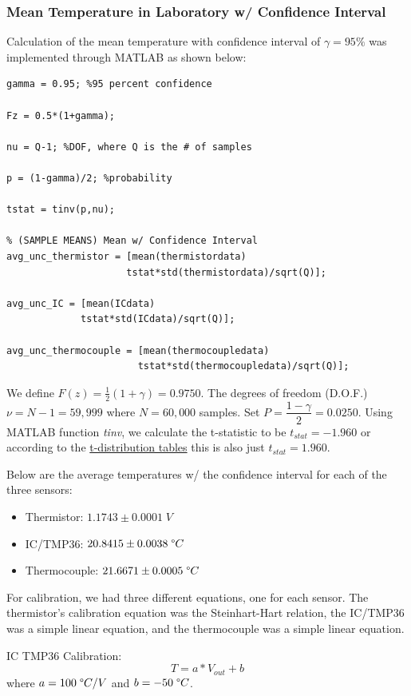 \documentclass{article}
\begin{document}
\subsubsection*{Mean Temperature in Laboratory w/ Confidence Interval}
Calculation of the mean temperature with confidence interval of $\gamma = 95\%$ was implemented through MATLAB as shown below:
\begin{lstlisting}[style=Matlab-editor]
% Confidence Interval in Laboratory
gamma = 0.95; %95 percent confidence

Fz = 0.5*(1+gamma);

nu = Q-1; %DOF, where Q is the # of samples

p = (1-gamma)/2; %probability

tstat = tinv(p,nu); 

% (SAMPLE MEANS) Mean w/ Confidence Interval
avg_unc_thermistor = [mean(thermistordata) 
                     tstat*std(thermistordata)/sqrt(Q)];

avg_unc_IC = [mean(ICdata) 
             tstat*std(ICdata)/sqrt(Q)];

avg_unc_thermocouple = [mean(thermocoupledata)  
                       tstat*std(thermocoupledata)/sqrt(Q)];
\end{lstlisting}

We define $F(z) = \frac{1}{2}(1+\gamma) = 0.9750$. The degrees of freedom (D.O.F.) $\nu = N - 1 = 59,999$ where $N=60,000$ samples. Set $P=\dfrac{1-\gamma}{2}=0.0250$. Using MATLAB function \textit{tinv}, we calculate the t-statistic to be $t_{stat} = -1.960$ or according to the \hyperlink{1}{t-distribution tables} this is also just $t_{stat}=1.960$.

Below are the average temperatures w/ the confidence interval for each of the three sensors:
\begin{itemize}
    \item Thermistor: \(1.1743 \pm 0.0001\; V \)
    \item IC/TMP36: \(20.8415 \pm 0.0038\; \degree C\)
    \item Thermocouple: \(21.6671 \pm 0.0005\; \degree C\)
\end{itemize}

For calibration, we had three different equations, one for each sensor. The thermistor's calibration equation was the Steinhart-Hart relation, the IC/TMP36 was a simple linear equation, and the thermocouple was a simple linear equation.

IC TMP36 Calibration:
\[
    T = a * V_{out} + b
\]
where $a = 100\; \degree C/V$ and $b = -50\; \degree C$.
\end{document}
